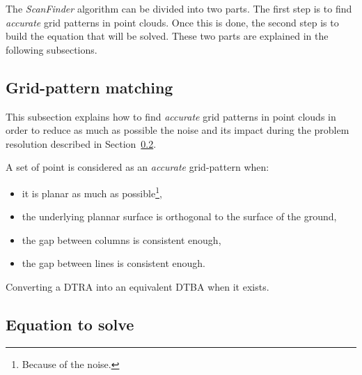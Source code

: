 The \emph{ScanFinder} algorithm can be divided into two parts. The first step is to find \emph{accurate} grid patterns in point clouds. Once this is done, the second step is to build the equation that will be solved. These two parts are explained in the following subsections.

\subsection{Grid-pattern matching}
This subsection explains how to find \emph{accurate} grid patterns in point clouds in order to reduce as much as possible the noise and its impact during the problem resolution described in Section~\ref{subsc:eq}.

A set of point is considered as an \emph{accurate} grid-pattern when:
\begin{itemize}
\item it is planar as much as possible\footnote{Because of the noise.},
\item the underlying plannar surface is orthogonal to the surface of the ground,
\item the gap between columns is consistent enough,
\item the gap between lines is consistent enough.
\end{itemize}


\begin{algorithm}[tb]
  \SetAlgoVlined
  \DontPrintSemicolon
  \SetArgSty{}
  \caption{Converting a DTRA into an equivalent DTBA when it exists.\label{alg:DTRA2DTBA}}
\end{algorithm}



\subsection{Equation to solve}
\label{subsc:eq}

